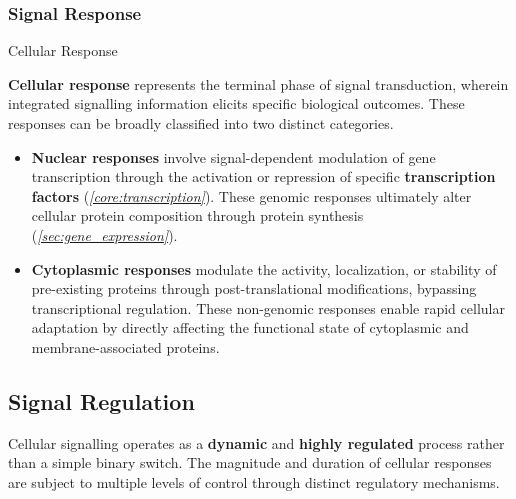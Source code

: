\documentclass[10pt]{article}
\begin{document}
    \subsubsection{Signal Response}

      \begin{core}{Cellular Response}

        \textbf{Cellular response} represents the terminal phase of signal transduction, wherein integrated signalling information elicits specific biological outcomes. These responses can be broadly classified into two distinct categories.
          

        \begin{itemize}

          \item \textbf{Nuclear responses} involve signal-dependent modulation of gene transcription through the activation or repression of specific \textbf{transcription factors} (\textit{\autoref{core:transcription}}). These genomic responses ultimately alter cellular protein composition through protein synthesis (\textit{\autoref{sec:gene_expression}}).

          \item \textbf{Cytoplasmic responses} modulate the activity, localization, or stability of pre-existing proteins through post-translational modifications, bypassing transcriptional regulation. These non-genomic responses enable rapid cellular adaptation by directly affecting the functional state of cytoplasmic and membrane-associated proteins.

        \end{itemize}

      \end{core}

  \subsection{Signal Regulation}
    
    Cellular signalling operates as a \textbf{dynamic} and \textbf{highly regulated} process rather than a simple binary switch. The magnitude and duration of cellular responses are subject to multiple levels of control through distinct regulatory mechanisms.
\end{document}
